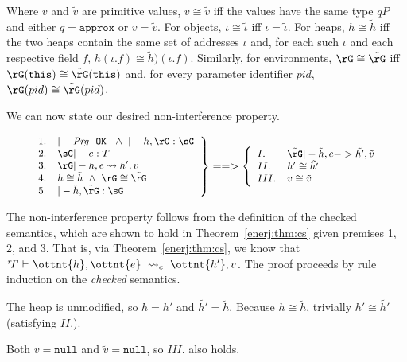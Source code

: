Where $v$ and $\tilde{v}$ are primitive values, $v \cong \tilde{v}$ iff the
values have the same type $qP$ and either $q = \mathtt{approx}$ or $v =
\tilde{v}$. For objects, $\iota \cong \tilde{\iota}$ iff $\iota =
\tilde{\iota}$.
For heaps, $h \cong \tilde{h}$ iff the two heaps contain the same set of
addresses $\iota$ and, for each such $\iota$ and each respective field
$f$, $h(\iota.f) \cong \tilde{h})(\iota.f)$. Similarly, for environments,
$\rG \cong \tilde{\rG}$ iff
$\rG(\texttt{this}) \cong \tilde{\rG}(\texttt{this})$ and, for every parameter
identifier $pid$, $\rG(pid) \cong \tilde{\rG}(pid)$.

We can now state our desired non-interference property.

\begin{theorem}
\label{enerj:thm:ni}
\[
\small
\left.
\begin{array}{ll}
1. & |- \mathit{Prg}\ \ \mathtt{OK} \ \ \wedge\  |- h, \rG : \sG\\
2. & \sG |- e : T\\
3. & \rG |- h, e \leadsto h', v\\
4. & h \cong \tilde{h}  \ \wedge\  \rG \cong \tilde{\rG}\\
5. & |- \tilde{h}, \tilde{\rG} : \sG\\
\end{array}
\right\}
==>
\left\{
\begin{array}{ll}
I. & \tilde{\rG} |- \tilde{h}, e -> \tilde{h'}, \tilde{v}\\
II. & h' \cong \tilde{h'}\\
III. & v \cong \tilde{v}
\end{array}
\right.
\]
\end{theorem}

The non-interference property follows from the definition of the checked
semantics, which are shown to hold in Theorem~\ref{enerj:thm:cs} given premises 1, 2,
and 3. That
is, via Theorem~\ref{enerj:thm:cs}, we know that 
$ \mathit{ {^r}\!\Gamma} \  \textsf{$\vdash$} \  \ottnt{h} ,  \ottnt{e} \ \leadsto_{c}\  \ottnt{h'} ,  v $. The proof proceeds by rule induction on the
\emph{checked} semantics.


The heap is unmodified, so $h = h'$ and $\tilde{h'} = \tilde{h}$. Because
$h \cong \tilde{h}$, trivially $h' \cong \tilde{h'}$ (satisfying $II.$).

Both $v = \mathtt{null}$ and $\tilde{v} = \mathtt{null}$, so $III.$ also holds.

